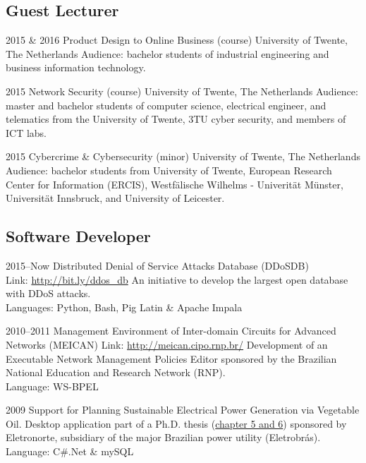 \documentclass[print]{friggeri-cv} %
\begin{document}
\subsection{Guest Lecturer}
\begin{entrylist}
\entry
{2015 \& 2016}
{Product Design to Online Business (course)}
{University of Twente, The Netherlands}
{Audience: bachelor students of industrial engineering and business information technology.}

\entry
{2015}
{Network Security (course)}
{University of Twente, The Netherlands}
{Audience: master and bachelor students of computer science, electrical engineer, and telematics from the University of Twente, 3TU cyber security, and members of ICT labs. }

\entry
{2015}
{Cybercrime \& Cybersecurity (minor)}
{University of Twente, The Netherlands}
{Audience: bachelor students from University of Twente, European Research Center for Information (ERCIS), Westfälische Wilhelms - Univerität Münster, Universität Innsbruck, and University of Leicester. }
\end{entrylist}

\subsection{Software Developer}
\begin{entrylist}


\entry
{2015--Now}
{Distributed Denial of Service Attacks Database (DDoSDB)}
{\\Link: \href{http://bit.ly/ddos_db}{http://bit.ly/ddos\_db} }
{An initiative to develop the largest open database with DDoS attacks.\\
Languages: Python, Bash, Pig Latin \& Apache Impala
}

\entry
{2010--2011}
{{Management Environment of Inter-domain Circuits for Advanced Networks (MEICAN)}}
{Link: \href{http://meican.cipo.rnp.br/}{http://meican.cipo.rnp.br/}}
{Development of an Executable Network Management Policies Editor sponsored by the Brazilian National Education and Research Network (RNP).    \\
Language: WS-BPEL
}

\entry
{2009}
{Support for Planning Sustainable Electrical Power Generation via Vegetable Oil.}
{}
{Desktop application part of a Ph.D. thesis (\href{https://sites.google.com/site/ceamazonufpa/TeseAnaRosaDuarte.pdf}{chapter 5 and 6}) sponsored by Eletronorte, subsidiary of the major Brazilian power utility (Eletrobrás).\\
Language: C\#.Net \& mySQL
}
\end{entrylist}
\end{document}
